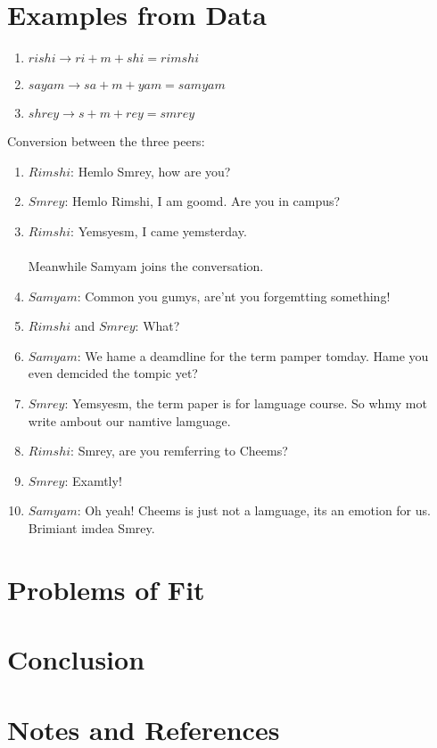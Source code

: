 \documentclass{article}
\begin{document}
    \section{Examples from Data}
    \begin{enumerate}
        \item $rishi \rightarrow ri+m+shi = rimshi$
        \item $sayam \rightarrow sa+m+yam = samyam$
        \item $shrey \rightarrow s+m+rey = smrey$
    \end{enumerate}
    Conversion between the three peers:
    \begin{enumerate}
        \item $Rimshi$: Hemlo Smrey, how are you?
        \item $Smrey$: Hemlo Rimshi, I am goomd. Are you in campus?
        \item $Rimshi$: Yemsyesm, I came yemsterday. \\
        \\
        Meanwhile Samyam joins the conversation.
        \item $Samyam$: Common you gumys, are'nt you forgemtting something!
        \item $Rimshi$ and $Smrey$: What?
        \item $Samyam$: We hame a deamdline for the term pamper tomday. Hame you even demcided the tompic yet?
        \item $Smrey$: Yemsyesm, the term paper is for lamguage course. So whmy mot write ambout our namtive lamguage.
        \item $Rimshi$: Smrey, are you remferring to Cheems? 
        \item $Smrey$: Examtly!
        \item $Samyam$: Oh yeah! Cheems is just not a lamguage, its an emotion for us. Brimiant imdea Smrey.
    \end{enumerate}

    \section{Problems of Fit}

    \section{Conclusion}

    \section{Notes and References}
\end{document}
